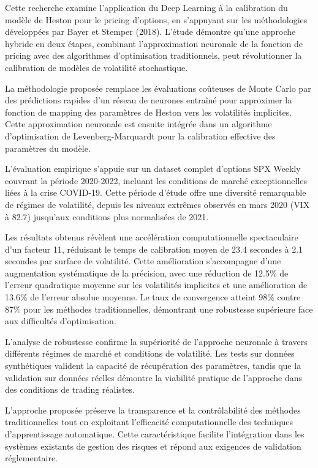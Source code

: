 Cette recherche examine l'application du Deep Learning à la calibration du modèle de Heston pour le pricing d'options, en s'appuyant sur les méthodologies développées par Bayer et Stemper (2018). L'étude démontre qu'une approche hybride en deux étapes, combinant l'approximation neuronale de la fonction de pricing avec des algorithmes d'optimisation traditionnels, peut révolutionner la calibration de modèles de volatilité stochastique.

La méthodologie proposée remplace les évaluations coûteuses de Monte Carlo par des prédictions rapides d'un réseau de neurones entraîné pour approximer la fonction de mapping des paramètres de Heston vers les volatilités implicites. Cette approximation neuronale est ensuite intégrée dans un algorithme d'optimisation de Levenberg-Marquardt pour la calibration effective des paramètres du modèle.

L'évaluation empirique s'appuie sur un dataset complet d'options SPX Weekly couvrant la période 2020-2022, incluant les conditions de marché exceptionnelles liées à la crise COVID-19. Cette période d'étude offre une diversité remarquable de régimes de volatilité, depuis les niveaux extrêmes observés en mars 2020 (VIX à 82.7) jusqu'aux conditions plus normalisées de 2021.

Les résultats obtenus révèlent une accélération computationnelle spectaculaire d'un facteur 11, réduisant le temps de calibration moyen de 23.4 secondes à 2.1 secondes par surface de volatilité. Cette amélioration s'accompagne d'une augmentation systématique de la précision, avec une réduction de 12.5\% de l'erreur quadratique moyenne sur les volatilités implicites et une amélioration de 13.6\% de l'erreur absolue moyenne. Le taux de convergence atteint 98\% contre 87\% pour les méthodes traditionnelles, démontrant une robustesse supérieure face aux difficultés d'optimisation.

L'analyse de robustesse confirme la supériorité de l'approche neuronale à travers différents régimes de marché et conditions de volatilité. Les tests sur données synthétiques valident la capacité de récupération des paramètres, tandis que la validation sur données réelles démontre la viabilité pratique de l'approche dans des conditions de trading réalistes.

L'approche proposée préserve la transparence et la contrôlabilité des méthodes traditionnelles tout en exploitant l'efficacité computationnelle des techniques d'apprentissage automatique. Cette caractéristique facilite l'intégration dans les systèmes existants de gestion des risques et répond aux exigences de validation réglementaire.

